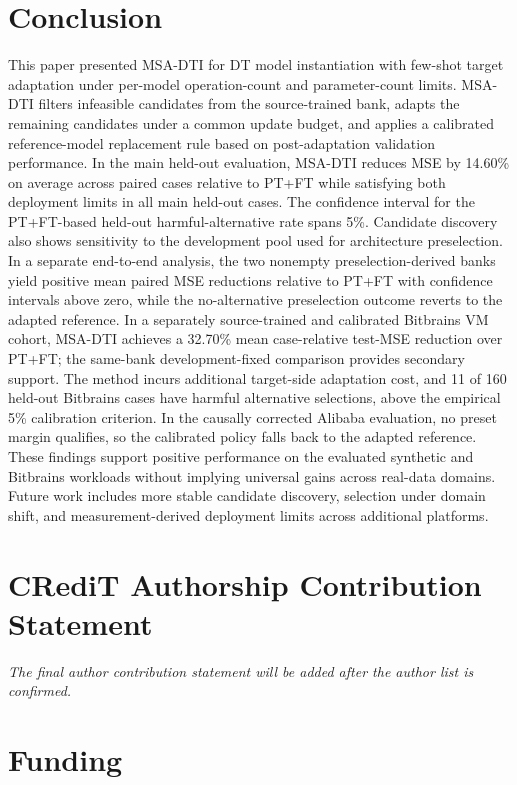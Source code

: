 \documentclass[a4paper,fleqn]{cas-sc}
\begin{document}
\section{Conclusion}
\label{sec:conclusion}

This paper presented MSA-DTI for DT model instantiation with few-shot target
adaptation under per-model operation-count and parameter-count limits. MSA-DTI filters
infeasible candidates from the source-trained bank, adapts the remaining
candidates under a common update budget, and applies a calibrated
reference-model replacement rule based on post-adaptation validation
performance. In the main held-out evaluation, MSA-DTI reduces MSE by 14.60\%
on average across paired cases relative to PT+FT while satisfying both
deployment limits in all main held-out cases. The confidence interval for the
PT+FT-based held-out harmful-alternative rate spans 5\%. Candidate
discovery also shows sensitivity to the development pool used for architecture
preselection. In a separate end-to-end analysis, the two nonempty
preselection-derived banks yield positive mean paired MSE reductions relative
to PT+FT with confidence intervals above zero, while the no-alternative
preselection outcome reverts to the adapted reference. In a separately source-trained and calibrated Bitbrains VM cohort,
MSA-DTI achieves a 32.70\% mean case-relative test-MSE reduction over
PT+FT; the same-bank development-fixed comparison provides secondary
support. The method incurs additional target-side adaptation cost, and
11 of 160 held-out Bitbrains cases have harmful alternative selections,
above the empirical 5\% calibration criterion. In the causally corrected
Alibaba evaluation, no preset margin qualifies, so the calibrated policy
falls back to the adapted reference. These findings support positive
performance on the evaluated synthetic and Bitbrains workloads without
implying universal gains across real-data domains. Future work includes
more stable candidate discovery, selection under domain shift, and
measurement-derived deployment limits across additional platforms.

\section*{CRediT Authorship Contribution Statement}

\textit{The final author contribution statement will be added after the
author list is confirmed.}

\section*{Funding}
\end{document}
